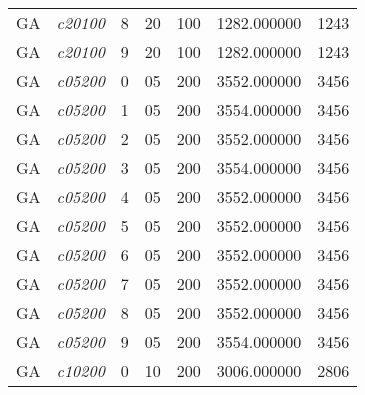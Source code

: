 {\begin{longtable}{cc|c|cc|cc}
			GA                 & \textit{c20100}    & 8                               & 20               & 100              & 1282.000000                          & 1243 \\  
			GA                 & \textit{c20100}    & 9                               & 20               & 100              & 1282.000000                          & 1243 \\  \hline
			GA                 & \textit{c05200}    & 0                               & 05               & 200              & 3552.000000                          & 3456 \\  
			GA                 & \textit{c05200}    & 1                               & 05               & 200              & 3554.000000                          & 3456 \\  
			GA                 & \textit{c05200}    & 2                               & 05               & 200              & 3552.000000                          & 3456 \\  
			GA                 & \textit{c05200}    & 3                               & 05               & 200              & 3554.000000                          & 3456 \\  
			GA                 & \textit{c05200}    & 4                               & 05               & 200              & 3552.000000                          & 3456 \\  
			GA                 & \textit{c05200}    & 5                               & 05               & 200              & 3552.000000                          & 3456 \\  
			GA                 & \textit{c05200}    & 6                               & 05               & 200              & 3552.000000                          & 3456 \\  
			GA                 & \textit{c05200}    & 7                               & 05               & 200              & 3552.000000                          & 3456 \\  
			GA                 & \textit{c05200}    & 8                               & 05               & 200              & 3552.000000                          & 3456 \\  
			GA                 & \textit{c05200}    & 9                               & 05               & 200              & 3554.000000                          & 3456 \\  \hline
			GA                 & \textit{c10200}    & 0                               & 10               & 200              & 3006.000000                          & 2806 \\  

\end{longtable}}
